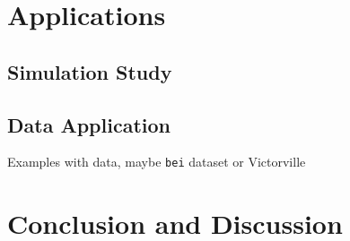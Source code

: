 \documentclass[]{interact}
\begin{document}
\section{Applications}


\subsection{Simulation Study}


\subsection{Data Application}

Examples with data, maybe \texttt{bei} dataset or Victorville


\section{Conclusion and Discussion}





\end{document}
